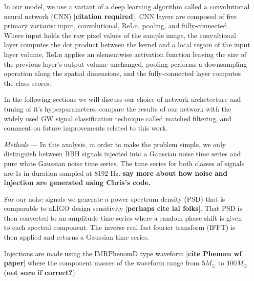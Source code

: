 \documentclass[%
 amsmath,amssymb,
 aps,
 twocolumn,
]{revtex4-1}
\begin{document}
In our model, we use a variant of a deep learning algorithm called a convolutional neural network (CNN) [\textbf{citation required}]. CNN layers are composed of five primary variants: input, convolutional, ReLu, pooling, and fully-connected. Where input holds the raw pixel values of the sample image, the convultional layer computes the dot product between the kernel and a local region of the input layer volume, ReLu applies an elementwise activation function leaving the size of the previous layer's output volume unchanged, pooling performs a downsampling operation along the spatial dimensions, and the fully-connected layer computes the class scores. 

In the following sections we will discuss our choice of network archetecture and tuning of it's hyperparameters, compare the results of our network with the widely used GW signal classification technique called matched filtering, and comment on future improvements related to this work.      

\textit{Methods} --- In this analysis, in order to make the problem simple, we only distinguish between BBH signals injected into a Gaussian noise time series and pure white Gaussian noise time series. The time series for both classes of signals are 1s in duration sampled at 8192 Hz. \textbf{say more about how noise and injection are generated using Chris's code.} 

For our noise signals we generate a power spectrum density (PSD) that is comparable to aLIGO design sensitivity [\textbf{perhaps cite lal folks}]. That PSD is then converted to an amplitude time series where a random phase shift is given to each spectral component. The inverse real fast fourier transform (IFFT) is then applied and returns a Gaussian time series.

Injections are made using the IMRPhenomD type waveform [\textbf{cite Phenom wf paper}] where the component masses of the waveform range from 5\(M_\odot\) to 100\(M_\odot\) (\textbf{not sure if correct?}). 
\end{document}
